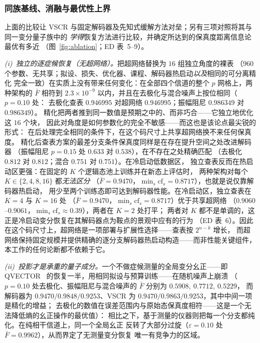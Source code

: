 \documentclass[11pt,a4paper]{article}
\begin{document}
\subsubsection*{同族基线、消融与最优性上界}

上面的比较让 VSCR 与固定解码器及先知式缓解方法对垒；另有三项对照将其与同一变分量子族中的
\emph{学得}恢复方法进行比较，并确定所达到的保真度距离信息论最优有多近
（图~\ref{fig:ablation}；ED 表~5--9）。

\emph{(i)~独立的逐症候恢复（无超网络）。}把超网络替换为 $16$ 组独立角度的裸表
（$960$ 个参数、无共享；拟设、损失、优化器、课程、解码器热启动\emph{以及}相同的可分离精化
完全一致）在实质上没有带来任何变化：在全部四个信道的整个 $p$ 网格上，两种架构的 $\bar F$
相符到 $2.3\times10^{-9}$ 以内，并且在去极化与混合噪声上按位相同（$p=0.10$ 处：
去极化查表 $0.946995$ 对超网络 $0.946995$；振幅阻尼 $0.986349$ 对 $0.986349$）。
精化把两者推到同一数值是预期之中的、而非巧合——它独立地优化这 $16$ 个块，
因此对角度是如何参数化的完全不敏感——而这也是该论点最尖锐的形式：
在后处理完全相同的条件下，在这个码尺寸上共享超网络换不来任何保真度。
精化后查表方案的最差分支条件保真度同样是在存在提升空间之处改进解码器
（振幅阻尼 $p=0.15$ 处 $0.633$ 对 $0.538$），在不存在之处精确匹配
（去极化 $0.812$ 对 $0.812$；混合 $0.751$ 对 $0.751$）。在冷启动低数据区，
独立查表反而在热启动区更强：在固定的 $K$ 个逻辑态池上训练并在新态上评估时，
两种架构对每个 $K\in\{2,4,8,16\}$ 都\emph{无法区分}
（$\bar F=0.9470$，$\min_s\mathrm{cf}_s=0.8717$），也就是说仅靠解码器热启动，
用少至两个训练态即可达到解码器性能。在冷启动区，独立查表在 $K{=}4$ 与 $K{=}16$ 处
（$\bar F=0.9470$，$\min_s\mathrm{cf}_s=0.8717$）优于共享超网络
（$0.9060$--$0.9061$，$\min_s\mathrm{cf}_s\approx0.39$），两者在 $K{=}2$ 处打平；
两者对 $K$ 都不是单调的，这正是冷启动变分恢复在其解码器点为鞍点的景观中应有的行为
（ED 表~6）。因此在这个码尺寸上，超网络是一项部署与扩展性选择——查表按 $2^{n-k}$ 增长，
而超网络保持固定规模并提供精确的逐分支解码器热启动构造——而非性能关键组件，
本工作的任何论断都不依赖于它。

\emph{(ii)~投影才是承重的量子成分。}一个不做症候测量的全局变分幺正——即
QVECTOR~\cite{johnson_qvector} 的恢复一半，用相同拟设与预算训练——在随机噪声上崩溃
（$p=0.10$ 处去极化、振幅阻尼与混合噪声的 $\bar F$ 分别为 $0.5908,\ 0.7712,\ 0.5229$，
而解码器为 $0.9470/0.9848/0.9253$、VSCR 为 $0.9470/0.9863/0.9253$，其中中间一项是精化的增益；
去极化的数值在误差范围内与原始态保真度相符——这是一个无法降低熵的幺正操作的最优值）：
相比之下，基于测量的仪器则把每一个分支都纯化。在纯相干信道上，同一个全局幺正
反转了大部分过旋（$\varepsilon=0.10$ 处 $\bar F=0.9962$），从而界定了无测量变分恢复
唯一有竞争力的区域。
\end{document}
